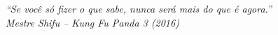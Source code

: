 \documentclass[
	12pt,		%
	a4paper,	%
	openright,  %
	oneside,	%
	chapter=TITLE,		%
	section=TITLE,		%
	english,	%
	brazilian   %
]{abntex2}
\begin{document}

%
\begin{epigrafe}
	\vspace*{\fill}
	\begin{flushright}
		\textit{
			``Se você só fizer o que sabe, nunca será mais do que é agora.''\\
			Mestre Shifu -- Kung Fu Panda 3 (2016)
		}
	\end{flushright}
\end{epigrafe}
\end{document}
